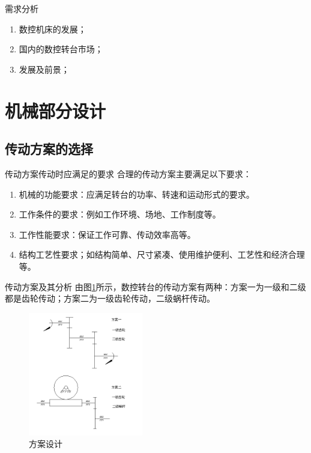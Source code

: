 \documentclass[12pt,xcolor={rgb}]{beamer}
\begin{document}
\begin{frame}{需求分析}
\begin{enumerate}
	\item 数控机床的发展；
	\item 国内的数控转台市场；
	\item 发展及前景；
\end{enumerate}
\end{frame}

\section{机械部分设计}

\subsection{传动方案的选择}

\begin{frame}{传动方案传动时应满足的要求}
合理的传动方案主要满足以下要求：
\begin{enumerate}
	\item 机械的功能要求：应满足转台的功率、转速和运动形式的要求。
	\item 工作条件的要求：例如工作环境、场地、工作制度等。
	\item 工作性能要求：保证工作可靠、传动效率高等。
	\item 结构工艺性要求；如结构简单、尺寸紧凑、使用维护便利、工艺性和经济合理等。
\end{enumerate}
\end{frame}

\begin{frame}{传动方案及其分析}
由图\ref{方案设计}所示，数控转台的传动方案有两种：方案一为一级和二级都是齿轮传动；方案二为一级齿轮传动，二级蜗杆传动。

\begin{figure}[htb]
	\begin{center}
		\includegraphics[width=5cm]{images/1}
		\caption{方案设计}  \label{方案设计}
	\end{center}
\end{figure}
\end{frame}
\end{document}
